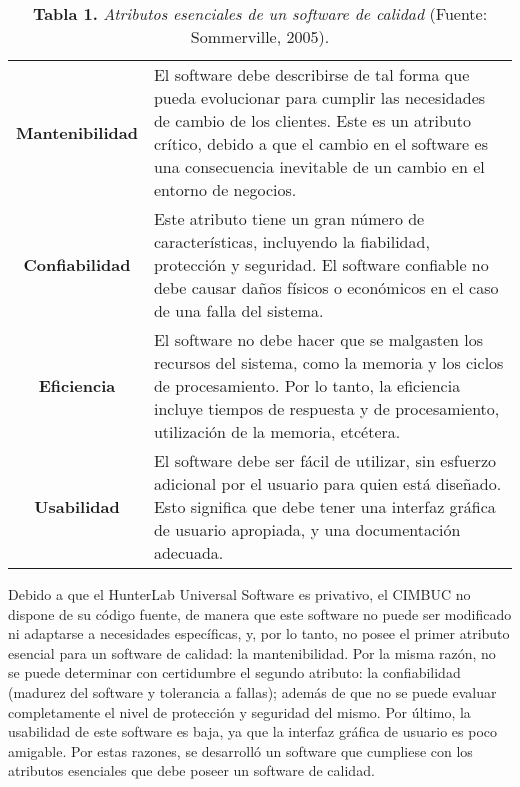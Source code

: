 		\begin{table}[htb]
			\small
			\caption{\textbf{Tabla 1.} \textit{Atributos esenciales de un software de calidad} (Fuente: Sommerville, 2005).}
			\label{tabla_1}
			\centering
			\setlength{\extrarowheight}{3.5pt}
			\begin{tabulary}{15cm}{|c|J|}
				
				\hline
				 & \\ \hline
			\textbf{Mantenibilidad} & El software debe describirse de tal forma que pueda evolucionar  para cumplir las necesidades de cambio de los 					clientes. Este es un atributo cr\'{i}tico, debido a que el cambio en el software es una consecuencia inevitable de un cambio en el entorno de negocios.\\ \hline
			\textbf{Confiabilidad} & Este atributo tiene un gran n\'{u}mero de caracter\'{i}sticas, incluyendo la fiabilidad, protecci\'{o}n y seguridad. El software confiable no debe causar da\~{n}os f\'{i}sicos o econ\'{o}micos en el caso de una falla del sistema.\\ \hline
			\textbf{Eficiencia} & El software no debe hacer que se malgasten los recursos del sistema, como la memoria y los ciclos de procesamiento. Por lo tanto, la eficiencia incluye tiempos de respuesta y de procesamiento, utilizaci\'{o}n de la memoria, etc\'{e}tera.\\ \hline
			\textbf{Usabilidad} & El software debe ser f\'{a}cil de utilizar, sin esfuerzo adicional por el usuario para quien est\'{a} dise\~{n}ado. Esto significa que debe tener una interfaz gr\'{a}fica de usuario apropiada, y una documentaci\'{o}n adecuada.\\ \hline
			\end{tabulary}
		\end{table}
		\FloatBarrier %

Debido a que el HunterLab Universal Software es privativo, el CIMBUC no dispone de su c\'{o}digo fuente, de manera que este software no puede ser modificado ni adaptarse a necesidades espec\'{i}ficas, y, por lo tanto, no posee el primer atributo esencial para un software de calidad: la mantenibilidad. Por la misma raz\'{o}n, no se puede determinar con certidumbre el segundo atributo: la confiabilidad (madurez del software y tolerancia a fallas); adem\'{a}s de que no se puede evaluar completamente el nivel de protecci\'{o}n y seguridad del mismo. Por \'{u}ltimo, la usabilidad de este software es baja, ya que la interfaz gr\'{a}fica de usuario es poco amigable. Por estas razones, se desarroll\'{o} un software que cumpliese con los atributos esenciales que debe poseer un software de calidad.

